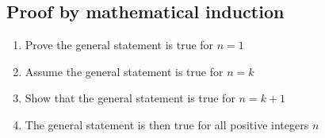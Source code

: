 \subsection{Proof by mathematical induction}
\begin{enumerate}
	\item Prove the general statement is true for $n=1$
	\item Assume the general statement is true for $n=k$
	\item Show that the general statement is true for $n=k+1$
	\item The general statement is then true for all positive integers $n$
\end{enumerate}